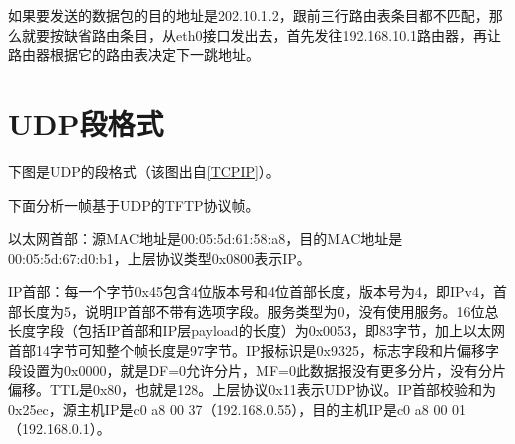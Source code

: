 如果要发送的数据包的目的地址是202.\BookSplit{}10.\BookSplit{}1.\BookSplit{}2，跟前三行路由表条目都不匹配，那么就要按缺省路由条目，从eth0接口发出去，首先发往192.\BookSplit{}168.\BookSplit{}10.\BookSplit{}1路由器，再让路由器根据它的路由表决定下一跳地址。




\section{UDP段格式}
%
下图是UDP的段格式（该图出自\hyperlink{db.bi01.bibli.tcpip}{[TCPIP]}）。




下面分析一帧基于UDP的TFTP协议帧。


\begin{BookLiteral}
\end{BookLiteral}


以太网首部：源MAC地址是00:\BookSplit{}05:\BookSplit{}5d:\BookSplit{}61:\BookSplit{}58:\BookSplit{}a8，目的MAC地址是00:\BookSplit{}05:\BookSplit{}5d:\BookSplit{}67:\BookSplit{}d0:\BookSplit{}b1，上层协议类型0x0800表示IP。



IP首部：每一个字节0x45包含4位版本号和4位首部长度，版本号为4，即IPv4，首部长度为5，说明IP首部不带有选项字段。服务类型为0，没有使用服务。16位总长度字段（包括IP首部和IP层payload的长度）为0x0053，即83字节，加上以太网首部14字节可知整个帧长度是97字节。IP报标识是0x9325，标志字段和片偏移字段设置为0x0000，就是DF=\BookSplit{}0允许分片，MF=\BookSplit{}0此数据报没有更多分片，没有分片偏移。TTL是0x80，也就是128。上层协议0x11表示UDP协议。IP首部校验和为0x25ec，源主机IP是c0 a8 00 37（192.\BookSplit{}168.\BookSplit{}0.\BookSplit{}55），目的主机IP是c0 a8 00 01（192.\BookSplit{}168.\BookSplit{}0.\BookSplit{}1）。



